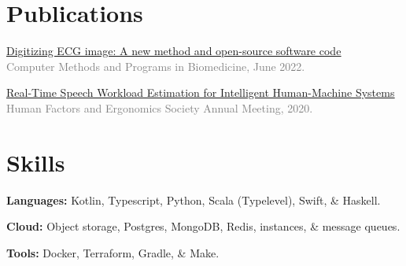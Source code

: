 \documentclass[10pt]{article} %
\let\defaultref\href
\renewcommand{\href}[2]{%
  \defaultref{#1}{\ul{#2}}%
}
\renewcommand{\emph}[1]{%
  \textcolor{gray}{#1}%
}
\begin{document}
\begin{paracol}{2}
\hypertarget{publications}{%
\section{Publications}\label{publications}}

\vspace{1pt}

\href{https://doi.org/10.1101/2021.07.13.21260461}{Digitizing ECG image:
A new method and open-source software code}\\
\emph{Computer Methods and Programs in Biomedicine, June 2022.}

\href{https://doi.org/10.1177/1071181320641076}{Real-Time Speech
Workload Estimation for Intelligent Human-Machine Systems}\\
\emph{Human Factors and Ergonomics Society Annual Meeting, 2020.}

\hypertarget{skills}{%
\section{Skills}\label{skills}}

\textbf{Languages:} Kotlin, Typescript, Python, Scala (Typelevel),
Swift, \& Haskell.

\textbf{Cloud:} Object storage, Postgres, MongoDB, Redis, instances, \&
message queues.

\textbf{Tools:} Docker, Terraform, Gradle, \& Make.

\end{paracol}

\end{document}
